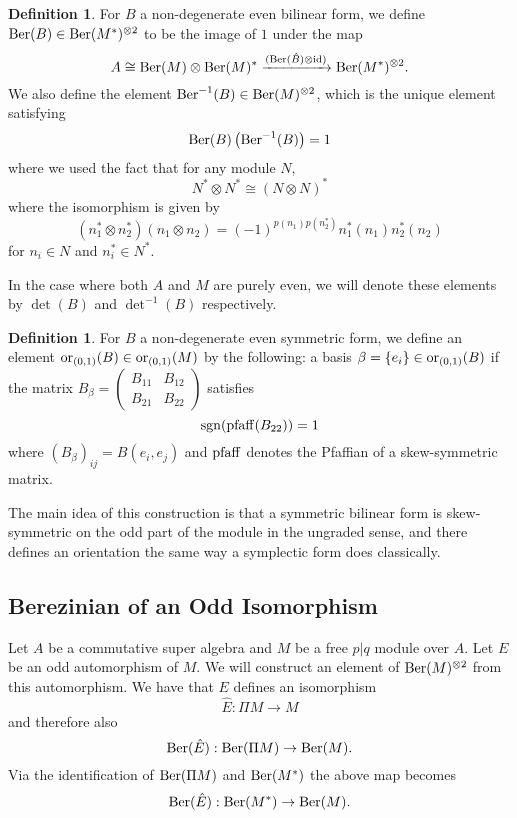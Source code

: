 \documentclass[11pt]{amsart}
\numberwithin{equation}{section}
\numberwithin{figure}{section}
\theoremstyle{plain}
\theoremstyle{definition}
\newtheorem{defn}[thm]{Definition}
\theoremstyle{remark}
\begin{document}
\begin{defn}
For $B$ a non-degenerate even bilinear form, we define $\mathrm{Ber}(B)\in\mathrm{Ber}(M^{*})^{\otimes2}$
to be the image of $1$ under the map 
\[
A\cong\mathrm{Ber}(M)\otimes\mathrm{Ber}(M)^{*}\xrightarrow{(\mathrm{Ber}(\hat{B})\otimes\mathrm{id})}\mathrm{Ber}(M^{*})^{\otimes2}.
\]
We also define the element $\mathrm{Ber}^{-1}(B)\in\mathrm{Ber}(M)^{\otimes2}$, which
is the unique element satisfying
\[
\mathrm{Ber}(B)\left(\mathrm{Ber}^{-1}(B)\right)=1
\]
where we used the fact that for any module $N$, 
\[
N^{*}\otimes N^{*}\cong\left(N\otimes N\right)^{*}
\]
where the isomorphism is given by 
\[
(n_{1}^{*}\otimes n_{2}^{*})(n_{1}\otimes n_{2})=\left(-1\right)^{p(n_{1})p(n_{2}^{*})}n_{1}^{*}(n_{1})n_{2}^{*}(n_{2})
\]
for $n_{i}\in N$ and $n_{i}^{*}\in N^{*}$.
\end{defn}
In the case where both $A$ and $M$ are purely even, we will denote
these elements by $\det(B)$ and $\det^{-1}(B)$ respectively. 
\begin{defn}
For $B$ a non-degenerate even symmetric form, we define an element
$\mathrm{or}_{(0,1)}(B)\in\mathrm{or}_{(0,1)}(M)$ by the following: a basis $\mathcal{\beta}=\{e_{i}\}\in\mathrm{or}_{(0,1)}(B)$
if the matrix $B_{\beta}=\left(\begin{matrix}B_{11} & B_{12}\\
B_{21} & B_{22}
\end{matrix}\right)$ satisfies 
\[
\mathrm{sgn}(\mathrm{pfaff}(B_{22}))=1
\]
where $\left(B_{\beta}\right)_{ij}=B(e_{i},e_{j})$ and $ $$\mathrm{pfaff}$
denotes the Pfaffian of a skew-symmetric matrix.
\end{defn}
The main idea of this construction is that a symmetric bilinear form
is skew-symmetric on the odd part of the module in the ungraded sense,
and there defines an orientation the same way a symplectic form does
classically. 


\subsection{Berezinian of an Odd Isomorphism\label{sub:Berezinian-of-an-odd-isomorphism}}

Let $A$ be a commutative super algebra and $M$ be a free $p|q$
module over $A$. Let $E$ be an odd automorphism of $M$. We will
construct an element of $\mathrm{Ber}(M)^{\otimes2}$ from this automorphism.
We have that $E$ defines an isomorphism 
\[
\hat{E}:\Pi M\rightarrow M
\]
and therefore also 
\[
\mathrm{Ber}(\hat{E}):\mathrm{Ber}(\Pi M)\rightarrow\mathrm{Ber}(M).
\]
Via the identification of $\mathrm{Ber}(\Pi M)$ and $\mathrm{Ber}(M^{*})$ the above
map becomes 
\[
\mathrm{Ber}(\hat{E}):\mathrm{Ber}(M^{*})\rightarrow\mathrm{Ber}(M).
\]
\end{document}
